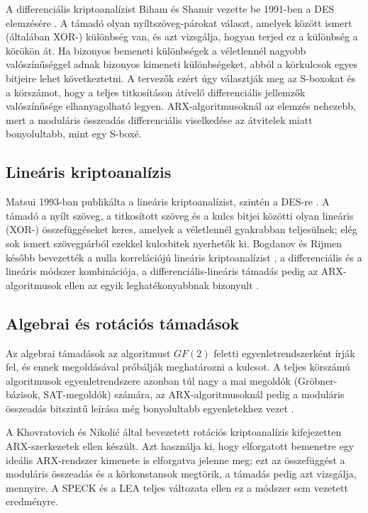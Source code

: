 \documentclass[a4paper,12pt]{report}
\theoremstyle{definition}
\theoremstyle{remark}
\begin{document}
A differenciális kriptoanalízist Biham és Shamir vezette be 1991-ben a DES elemzésére \cite{Biham1991}. A támadó olyan nyíltszöveg-párokat választ, amelyek között ismert (általában XOR-) különbség van, és azt vizsgálja, hogyan terjed ez a különbség a körökön át. Ha bizonyos bemeneti különbségek a véletlennél nagyobb valószínűséggel adnak bizonyos kimeneti különbségeket, abból a körkulcsok egyes bitjeire lehet következtetni. A tervezők ezért úgy választják meg az S-boxokat és a körszámot, hogy a teljes titkosításon átívelő differenciális jellemzők valószínűsége elhanyagolható legyen. ARX-algoritmusoknál az elemzés nehezebb, mert a moduláris összeadás differenciális viselkedése az átvitelek miatt bonyolultabb, mint egy S-boxé.

\subsection{Lineáris kriptoanalízis}

Matsui 1993-ban publikálta a lineáris kriptoanalízist, szintén a DES-re \cite{Matsui1993}. A támadó a nyílt szöveg, a titkosított szöveg és a kulcs bitjei közötti olyan lineáris (XOR-) összefüggéseket keres, amelyek a véletlennél gyakrabban teljesülnek; elég sok ismert szövegpárból ezekkel kulcsbitek nyerhetők ki. Bogdanov és Rijmen később bevezették a nulla korrelációjú lineáris kriptoanalízist \cite{Bogdanov2014}, a differenciális és a lineáris módszer kombinációja, a differenciális-lineáris támadás pedig az ARX-algoritmusok ellen az egyik leghatékonyabbnak bizonyult \cite{Chen2023}.

\subsection{Algebrai és rotációs támadások}

Az algebrai támadások az algoritmust $GF(2)$ feletti egyenletrendszerként írják fel, és ennek megoldásával próbálják meghatározni a kulcsot. A teljes körszámú algoritmusok egyenletrendszere azonban túl nagy a mai megoldók (Gröbner-bázisok, SAT-megoldók) számára, az ARX-algoritmusoknál pedig a moduláris összeadás bitszintű leírása még bonyolultabb egyenletekhez vezet \cite{Biryukov2017}.

A Khovratovich és Nikolić által bevezetett rotációs kriptoanalízis \cite{Khovratovich2010} kifejezetten ARX-szerkezetek ellen készült. Azt használja ki, hogy elforgatott bemenetre egy ideális ARX-rendszer kimenete is elforgatva jelenne meg; ezt az összefüggést a moduláris összeadás és a körkonstansok megtörik, a támadás pedig azt vizsgálja, mennyire. A SPECK és a LEA teljes változata ellen ez a módszer sem vezetett eredményre.
\end{document}

